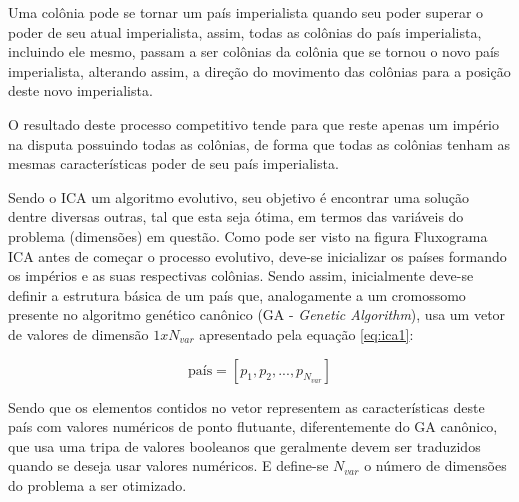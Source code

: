 Uma colônia pode se tornar um país imperialista quando seu poder superar o poder de seu atual imperialista, assim, todas as colônias do país imperialista, incluindo ele mesmo, passam a ser colônias da colônia que se tornou o novo país imperialista, alterando assim, a direção do movimento das colônias para a posição deste novo imperialista.

O resultado deste processo competitivo tende para que reste apenas um império na disputa possuindo todas as colônias, de forma que todas as colônias tenham as mesmas características poder de seu país imperialista.

Sendo o ICA um algoritmo evolutivo, seu objetivo é encontrar uma solução dentre diversas outras, tal que esta seja ótima, em termos das variáveis do problema (dimensões) em questão.  Como pode ser visto na figura Fluxograma ICA antes de começar o processo evolutivo, deve-se inicializar os países formando os impérios e as suas respectivas colônias. Sendo assim, inicialmente deve-se definir a estrutura básica de um país que, analogamente a um cromossomo presente no algoritmo genético canônico (GA - \emph{Genetic Algorithm}), usa um vetor de valores de dimensão \(1xN_{var}\) apresentado pela equação \ref{eq:ica1}:

\begin{equation}
\label{eq:ica1}
\text{país} = [p_{1},p_{2},...,p_{N_{var}}] 
\end{equation}

Sendo que os elementos contidos no vetor representem as características deste país com valores numéricos de ponto flutuante, diferentemente do GA canônico, que usa uma tripa de valores booleanos que geralmente devem ser traduzidos quando se deseja usar valores numéricos. E define-se \(N_{var}\) o número de dimensões do problema a ser otimizado. 


